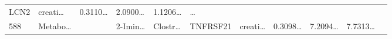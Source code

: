 \documentclass[
]{article}
\begin{document}
\begin{longtable}[]{@{}lllllllllll@{}}
\begin{minipage}[t]{0.07\columnwidth}
LCN2\strut
\end{minipage} & \begin{minipage}[t]{0.09\columnwidth}\raggedright
creati\ldots{}\strut
\end{minipage} & \begin{minipage}[t]{0.07\columnwidth}\raggedright
0.3110\ldots{}\strut
\end{minipage} & \begin{minipage}[t]{0.07\columnwidth}\raggedright
2.0900\ldots{}\strut
\end{minipage} & \begin{minipage}[t]{0.07\columnwidth}\raggedright
1.1206\ldots{}\strut
\end{minipage} & \begin{minipage}[t]{0.03\columnwidth}\raggedright
\ldots{}\strut
\end{minipage}\tabularnewline
\begin{minipage}[t]{0.03\columnwidth}\raggedright
588\strut
\end{minipage} & \begin{minipage}[t]{0.07\columnwidth}\raggedright
Metabo\ldots{}\strut
\end{minipage} & \begin{minipage}[t]{0.07\columnwidth}\raggedright
\strut
\end{minipage} & \begin{minipage}[t]{0.09\columnwidth}\raggedright
2-Imin\ldots{}\strut
\end{minipage} & \begin{minipage}[t]{0.07\columnwidth}\raggedright
Clostr\ldots{}\strut
\end{minipage} & \begin{minipage}[t]{0.07\columnwidth}\raggedright
TNFRSF21\strut
\end{minipage} & \begin{minipage}[t]{0.09\columnwidth}\raggedright
creati\ldots{}\strut
\end{minipage} & \begin{minipage}[t]{0.07\columnwidth}\raggedright
0.3098\ldots{}\strut
\end{minipage} & \begin{minipage}[t]{0.07\columnwidth}\raggedright
7.2094\ldots{}\strut
\end{minipage} & \begin{minipage}[t]{0.07\columnwidth}\raggedright
7.7313\ldots{}\strut
\end{minipage} & \begin{minipage}[t]{0.03\columnwidth}\raggedright

\end{minipage}
\end{longtable}
\end{document}

